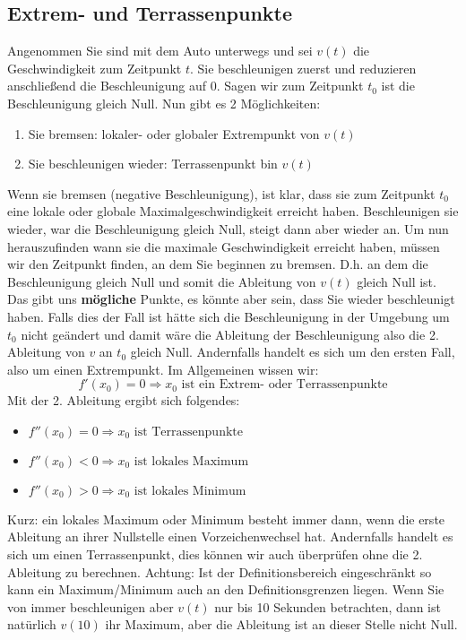 \subsection{Extrem- und Terrassenpunkte}
Angenommen Sie sind mit dem Auto unterwegs und sei $v(t)$ die Geschwindigkeit zum Zeitpunkt $t$. Sie beschleunigen zuerst und reduzieren anschließend die Beschleunigung auf $0$. Sagen wir zum Zeitpunkt $t_0$ ist die Beschleunigung gleich Null. Nun gibt es 2 Möglichkeiten:
\begin{enumerate}
\item Sie bremsen: lokaler- oder globaler Extrempunkt von $v(t)$
\item Sie beschleunigen wieder: Terrassenpunkt bin $v(t)$
\end{enumerate}
Wenn sie bremsen (negative Beschleunigung), ist klar, dass sie zum Zeitpunkt $t_0$ eine lokale oder globale Maximalgeschwindigkeit erreicht haben. Beschleunigen sie wieder, war die Beschleunigung gleich Null, steigt dann aber wieder an. Um nun herauszufinden wann sie die maximale Geschwindigkeit erreicht haben, müssen wir den Zeitpunkt finden, an dem Sie beginnen zu bremsen. D.h. an dem die Beschleunigung gleich Null und somit die Ableitung von $v(t)$ gleich Null ist. Das gibt uns \textbf{mögliche} Punkte, es könnte aber sein, dass Sie wieder beschleunigt haben. Falls dies der Fall ist hätte sich die Beschleunigung in der Umgebung um $t_0$ nicht geändert und damit wäre die Ableitung der Beschleunigung also die 2. Ableitung von $v$ an $t_0$ gleich Null. Andernfalls handelt es sich um den ersten Fall, also um einen Extrempunkt. Im Allgemeinen wissen wir:
\begin{equation*}
f'(x_0) = 0 \Rightarrow x_0 \text{ ist ein Extrem- oder Terrassenpunkte}
\end{equation*}
Mit der 2. Ableitung ergibt sich folgendes:
\begin{itemize}
\item $f''(x_0) = 0 \Rightarrow x_0 \text{ ist Terrassenpunkte}$ 
\item $f''(x_0) < 0 \Rightarrow x_0 \text{ ist lokales Maximum }$
\item $f''(x_0) > 0 \Rightarrow x_0 \text{ ist lokales Minimum}$
\end{itemize}
Kurz: ein lokales Maximum oder Minimum besteht immer dann, wenn die erste Ableitung an ihrer Nullstelle einen Vorzeichenwechsel hat. Andernfalls handelt es sich um einen Terrassenpunkt, dies können wir auch überprüfen ohne die 2. Ableitung zu berechnen. Achtung: Ist der Definitionsbereich eingeschränkt so kann ein Maximum/Minimum auch an den Definitionsgrenzen liegen. Wenn Sie von immer beschleunigen aber $v(t)$ nur bis 10 Sekunden betrachten, dann ist natürlich $v(10)$ ihr Maximum, aber die Ableitung ist an dieser Stelle nicht Null.

